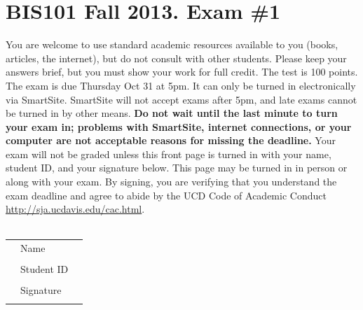 \documentclass[]{article}
\begin{document}
\section*{BIS101 Fall 2013. Exam \#1}
You are welcome to use standard academic resources available to you (books, articles, the internet), but do not consult with other students.  Please keep your answers brief, but you must show your work for full credit.  The test is 100 points. The exam is due Thursday Oct 31 at 5pm.  It can only be turned in electronically via SmartSite.  SmartSite will not accept exams after 5pm, and late exams cannot be turned in by other means. {\bf Do not wait until the last minute to turn your exam in; problems with SmartSite, internet connections, or your computer are not acceptable reasons for missing the deadline.}  Your exam will not be graded unless this front page is turned in with your name, student ID, and your signature below.  This page may be turned in in person or along with your exam. By signing, you are verifying that you understand the exam deadline and agree to abide by the UCD Code of Academic Conduct \url{http://sja.ucdavis.edu/cac.html}.  \\
\vspace{2cm} \\

\begin{tabular}{lll}
& Name & \underline{\hspace{5cm}} \\
\vspace{2cm} \\
& Student ID & \underline{\hspace{5cm}} \\
\vspace{2cm} \\
& Signature & \underline{\hspace{5cm}} \\
\vspace{2cm} \\
\end{tabular}
\end{document}
